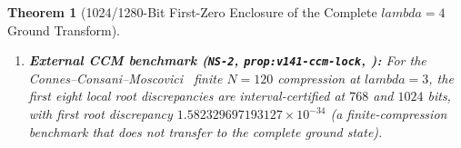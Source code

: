\documentclass[11pt]{article}
\def\lambda{lambda}%
\newtheorem{theorem}{Theorem}[section]
\theoremstyle{remark}
\begin{document}
\begin{theorem}[1024/1280-Bit First-Zero Enclosure of the Complete $\lambda = 4$ Ground Transform]
\begin{enumerate}[label=(\alph*)]
  \begin{equation}\label{eq:v143-first-zero-absolute}
    -8.752082 \times 10^{-33} < z_1(4) - \gamma_1 < 8.752082 \times 10^{-33}.
  \end{equation}
  The interval includes zero; neither the sign of $z_1(4) - \gamma_1$ nor a nonzero lower bound on $|z_1(4) - \gamma_1|$ is certified.
  \item \textbf{External CCM benchmark (\texttt{NS-2}, \texttt{prop:v141-ccm-lock}, ):} For the Connes--Consani--Moscovici~\cite{ConnesConsaniMoscovici2025} finite $N = 120$ compression at $\lambda = 3$, the first eight local root discrepancies are interval-certified at $768$ and $1024$ bits, with first root discrepancy $1.582329697193127 \times 10^{-34}$ (a finite-compression benchmark that does not transfer to the complete ground state).
\end{enumerate}
\end{theorem}
\end{document}
